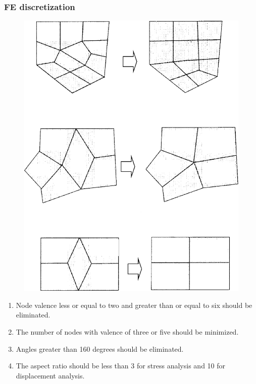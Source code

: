 \documentclass[notes]{beamer}
\begin{document}
\begin{frame}
\frametitle{FE discretization}
	
\noindent
\fboxsep=0pt
\noindent
\begin{minipage}[t]{0.49\linewidth}
	\begin{figure}
		\includegraphics[width=\textwidth]{figs/element-repair.png}
	\end{figure}
\end{minipage}%
\hfill%
\begin{minipage}[t]{0.49\linewidth}
	\begin{enumerate}
		\item Node valence less or equal to two and greater than or equal to
		six should be eliminated.
		\item The number of nodes with valence of three or five should be
		minimized.
		\item Angles greater than 160 degrees should be eliminated.
		\item The aspect ratio should be less than 3 for stress analysis and
		10 for displacement analysis.
	\end{enumerate}
\end{minipage}	
\end{frame}
\end{document}
